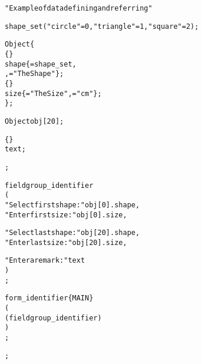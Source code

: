 \begin{boxedminipage}[t]{\linewidth}
\begin{alltt}
\DESCRIPTION "Example of data defining and referring"

\DATAPOOL
  \SET shape_set ( "circle" = 0, "triangle" = 1, "square"= 2 );

  \STRUCT Object \{
     \INTEGER \{\EDITABLE\}
        shape \{\SET = shape_set,\COMBOBOX
              ,\LABEL = "The Shape"\};
     \REAL \{\OPTIONAL\}
        size  \{\LABEL = "The Size", \UNIT = "cm"\};
  \};

  Object obj[20];

  \STRING \{\EDITABLE\}
     text;

\END \DATAPOOL;

\UIMANAGER
  \FIELDGROUP
    fieldgroup\_identifier
    (
      "Select first shape:" obj[0].shape,
      "Enter first size:"   obj[0].size,

      "Select last shape:"  obj[20].shape,
      "Enter last size:"    obj[20].size,

      "Enter a remark:"     text
    )
  ;

  \FORM
    form_identifier \{MAIN\}
    (
      (fieldgroup_identifier)
    )
  ;

\END \UIMANAGER;

\end{alltt}
\end{boxedminipage}
